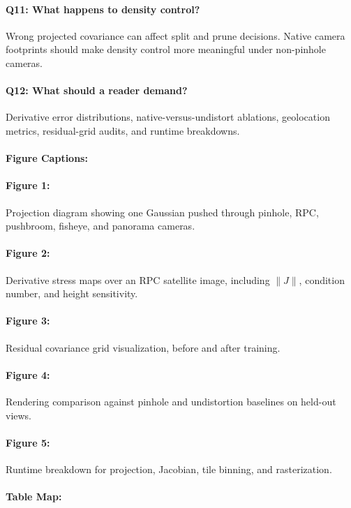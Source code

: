 \documentclass{article}
\begin{document}
\paragraph{Q11: What happens to density control?}
Wrong projected covariance can affect split and prune decisions. Native camera footprints should make density control more meaningful under non-pinhole cameras.

\paragraph{Q12: What should a reader demand?}
Derivative error distributions, native-versus-undistort ablations, geolocation metrics, residual-grid audits, and runtime breakdowns.

\paragraph{Figure Captions:}

\paragraph{Figure 1:}
Projection diagram showing one Gaussian pushed through pinhole, RPC, pushbroom, fisheye, and panorama cameras.

\paragraph{Figure 2:}
Derivative stress maps over an RPC satellite image, including $\|J\|$, condition number, and height sensitivity.

\paragraph{Figure 3:}
Residual covariance grid visualization, before and after training.

\paragraph{Figure 4:}
Rendering comparison against pinhole and undistortion baselines on held-out views.

\paragraph{Figure 5:}
Runtime breakdown for projection, Jacobian, tile binning, and rasterization.

\paragraph{Table Map:}
\end{document}
